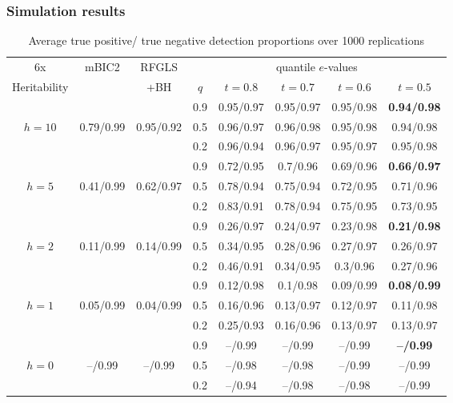 \documentclass[handout,10pt]{beamer}
\begin{document}
\begin{frame}
\frametitle{Simulation results}

\begin{table}
\begin{scriptsize}
\centering
    \begin{tabular}{c|c|c|c|cccc}
    \hline
    6x    & mBIC2       & RFGLS  & \multicolumn{5}{|c}{quantile $e$-values}    \\\cline{4-8}
    Heritability    &           & +BH		 & $q$    & $t=0.8$     & $t=0.7$     & $t=0.6$     & $t=0.5$     \\
    \hline
    ~    & ~         & ~         & 0.9      & 0.95/0.97 & 0.95/0.97 & 0.95/0.98 & \textbf{0.94/0.98} \\
    $h=10$ & 0.79/0.99 & 0.95/0.92 & 0.5      & 0.96/0.97 & 0.96/0.98 & 0.95/0.98 & 0.94/0.98 \\
    ~    & ~         & ~         & 0.2      & 0.96/0.94 & 0.96/0.97 & 0.95/0.97 & 0.95/0.98 \\\hline
    ~    & ~         & ~         & 0.9      & 0.72/0.95 & 0.7/0.96  & 0.69/0.96 & \textbf{0.66/0.97} \\
    $h=5$  & 0.41/0.99 & 0.62/0.97 & 0.5      & 0.78/0.94 & 0.75/0.94 & 0.72/0.95 & 0.71/0.96 \\
    ~    & ~         & ~         & 0.2      & 0.83/0.91 & 0.78/0.94 & 0.75/0.95 & 0.73/0.95 \\\hline
    ~    & ~         & ~         & 0.9      & 0.26/0.97 & 0.24/0.97 & 0.23/0.98 & \textbf{0.21/0.98} \\
    $h=2$  & 0.11/0.99 & 0.14/0.99 & 0.5      & 0.34/0.95 & 0.28/0.96 & 0.27/0.97 & 0.26/0.97 \\
    ~    & ~         & ~         & 0.2      & 0.46/0.91 & 0.34/0.95 & 0.3/0.96  & 0.27/0.96 \\\hline
    ~    & ~         & ~         & 0.9      & 0.12/0.98 & 0.1/0.98  & 0.09/0.99 & \textbf{0.08/0.99} \\
    $h=1$  & 0.05/0.99 & 0.04/0.99    & 0.5      & 0.16/0.96 & 0.13/0.97 & 0.12/0.97 & 0.11/0.98 \\
    ~    & ~         & ~         & 0.2      & 0.25/0.93 & 0.16/0.96 & 0.13/0.97 & 0.13/0.97 \\\hline
    ~    & ~         & ~         & 0.9      & --/0.99 & --/0.99 & --/0.99 & \textbf{--/0.99}    \\
    $h=0$  & --/0.99 & --/0.99       & 0.5      & --/0.98 & --/0.98 & --/0.99 & --/0.99 \\
    ~    & ~         & ~         & 0.2      & --/0.94 & --/0.98 & --/0.98 & --/0.99 \\\hline
    \end{tabular}
\end{scriptsize}
\caption*{Average true positive/ true negative detection proportions over 1000 replications}
\end{table}
\end{frame}
\end{document}
